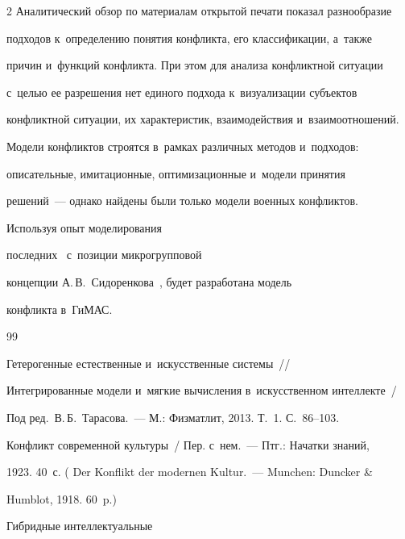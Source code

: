 \begin{multicols}{2}
  Аналитический обзор по материалам открытой печати показал разнообразие 

подходов к~определению понятия конфликта, его классификации, а~так\-же 

причин и~функций конфликта. При этом для анализа конфликтной ситуации 

с~целью ее разрешения нет единого подхода к~визуализации субъектов 

конфликтной ситуации, их характеристик, взаимодействия и~взаимоотношений. 

Модели конфликтов строятся в~рамках различных методов и~подходов: 

описательные, имитационные, оптимизационные и~модели принятия  

решений~--- однако найдены были только модели военных конфликтов. 

Используя опыт моделирования  

последних~\cite{15-r, 16-r, 17-r, 18-r, 19-r, 20-r, 21-r} с~позиции микрогрупповой 

концепции А.\,В.~Сидоренкова~\cite{10-r}, будет разработана модель 

конфликта в~\mbox{ГиМАС.}

  

  {\small\frenchspacing

 {%


 \begin{thebibliography}{99}


 Гетерогенные естественные и~искусственные системы~// 

Интегрированные модели и~мягкие вычисления в~искусственном интеллекте~/

Под ред.\ В.\,Б.~Тарасова.~--- М.: Физматлит, 2013. Т.~1. С.~86--103.




 Конфликт современной культуры~/ Пер. с~нем.~--- Птг.: Начатки знаний, 

1923. 40~с. ( Der Konflikt der modernen Kultur.~--- Munchen: Duncker \& 

Humblot, 1918. 60~p.)


 Гиб\-рид\-ные интеллектуальные 


\end{thebibliography}}}
\end{multicols}
